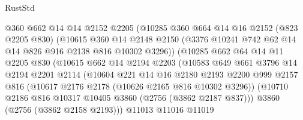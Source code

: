 \begin{lexlean}{RustStd}
\begin{coremodule}
                            @360
                            @662
                            @14
                            @14
                            @2152
                            @2205
                            (@10285
                              @360
                              @664
                              @14
                              @16
                              @2152
                              (@823 @2205 @830)
                              (@10615
                                @360
                                @14
                                @2148
                                @2150
                                (@3376 @10241 @742 @62 @14 @14 @826 @916 @2138 @816 @10302 @3296))
                              (@10285
                                @662
                                @64
                                @14
                                @11
                                @2205
                                @830
                                (@10615
                                  @662
                                  @14
                                  @2194
                                  @2203
                                  (@10583
                                    @649
                                    @661
                                    @3796
                                    @14
                                    @2194
                                    @2201
                                    @2114
                                    (@10604
                                      @221
                                      @14
                                      @16
                                      @2180
                                      @2193
                                      @2200
                                      @999
                                      @2157
                                      @816
                                      (@10617 @2176 @2178 (@10626 @2165 @816 @10302 @3296))
                                      (@10710
                                        @2186
                                        @816
                                        @10317
                                        @10405
                                        @3860
                                        (@2756 (@3862 @2187 @837)))
                                      @3860
                                      (@2756 (@3862 @2158 @2193)))
                                    @11013
                                    @11016
                                    @11019

\end{coremodule}
\end{lexlean}
